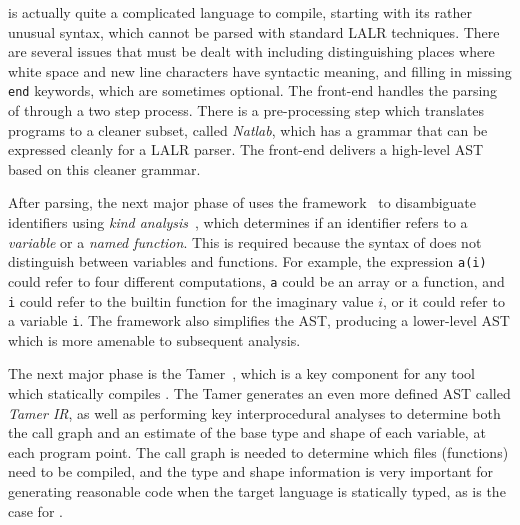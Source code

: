 \matlab is actually quite a complicated language to compile,  starting
with its rather unusual syntax,  which cannot be parsed with standard
LALR techniques.  There are several issues that must be dealt with
including distinguishing places where white space and new line characters have 
syntactic meaning, and filling in missing \lstinline!end! keywords,
which are sometimes optional.   The \mclab front-end
handles the parsing of \matlab through a two step process.  There is a
pre-processing step which translates \matlab programs to a cleaner
subset, called \textit{Natlab}, which has a grammar that can be
expressed cleanly for a LALR parser.    The \mclab front-end delivers a
high-level AST based on this cleaner grammar.  

After parsing,  the next major phase of \mixten uses the \mcsaf
framework~\cite{McSAFecoop12,JesseThesis} to disambiguate identifiers
using \textit{kind analysis}~\cite{KindAnalysis}, which determines if an
identifier refers to a \textit{variable} or a \textit{named function}.
This is required because the syntax of \matlab does not distinguish
between variables and functions. For example, the expression
\lstinline!a(i)! could refer to four different computations,
\lstinline!a! could be an array or a function,  and \lstinline!i! could
refer to the builtin function for the imaginary value $i$,  or it could
refer to a variable \lstinline!i!.    The \mcsaf framework also
simplifies the AST, producing a lower-level AST which is more amenable
to subsequent analysis.

The next major phase is the Tamer~\cite{TamerPaper}, which is a key
component for any tool which statically compiles \matlab.  The Tamer
generates an even more defined AST called \textit{Tamer IR}, as well as
performing key interprocedural analyses to determine both the call graph
and an estimate of the base type and shape of each variable, at each
program point.   The call graph is needed to determine which files
(functions) need to be compiled,  and the type and shape information is
very important for generating reasonable code when the target language
is statically typed, as is the case for \xten.  

